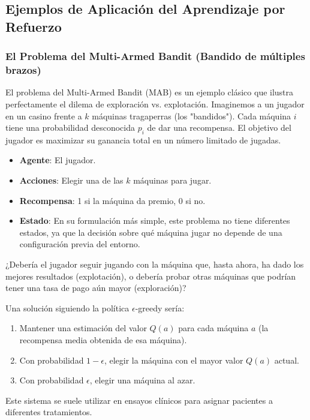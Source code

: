 \documentclass[12pt,a4paper]{book}
\begin{document}
\hrulefill

\subsection{Ejemplos de Aplicación del Aprendizaje por Refuerzo}

\subsubsection{El Problema del Multi-Armed Bandit (Bandido de múltiples brazos)}

El problema del Multi-Armed Bandit (MAB) \cite{MAB} es un ejemplo clásico que ilustra perfectamente el dilema de exploración vs. explotación. Imaginemos a un jugador en un casino frente a $k$ máquinas tragaperras (los "bandidos"). Cada máquina $i$ tiene una probabilidad desconocida $p_i$ de dar una recompensa. El objetivo del jugador es maximizar su ganancia total en un número limitado de jugadas.

\begin{itemize}
    \item \textbf{Agente}: El jugador.
    \item \textbf{Acciones}: Elegir una de las $k$ máquinas para jugar.
    \item \textbf{Recompensa}: 1 si la máquina da premio, 0 si no.
    \item \textbf{Estado}: En su formulación más simple, este problema no tiene diferentes estados, ya que la decisión sobre qué máquina jugar no depende de una configuración previa del entorno.
\end{itemize}

¿Debería el jugador seguir jugando con la máquina que, hasta ahora, ha dado los mejores resultados (explotación), o debería probar otras máquinas que podrían tener una tasa de pago aún mayor (exploración)?

Una solución siguiendo la política $\epsilon$-greedy sería:
\begin{enumerate}
    \item Mantener una estimación del valor $Q(a)$ para cada máquina $a$ (la recompensa media obtenida de esa máquina).
    \item Con probabilidad $1-\epsilon$, elegir la máquina con el mayor valor $Q(a)$ actual.
    \item Con probabilidad $\epsilon$, elegir una máquina al azar.
\end{enumerate}

Este sistema se suele utilizar en ensayos clínicos para asignar pacientes a diferentes tratamientos.
\end{document}

